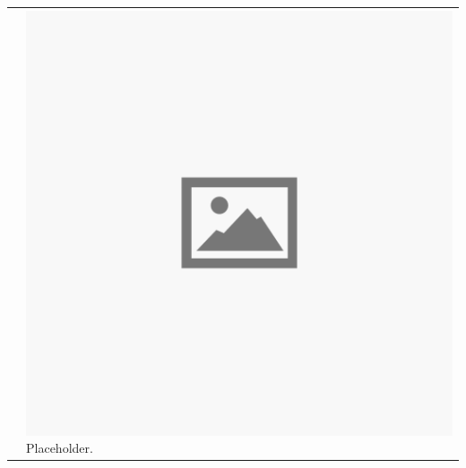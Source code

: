 \begin{tabular}{c p{}}
	\begin{minipage}[t]{0.75\textwidth}
		\vspace*{-64px}
		\blindtext
	\end{minipage} &
	
	\begin{minipage}{0.25\textwidth}
		\vspace*{48px}
		\includegraphics[width=\linewidth]{Images/Placeholder}
		\centering \label{fig:test_d}Placeholder.
	\end{minipage} 
\end{tabular}